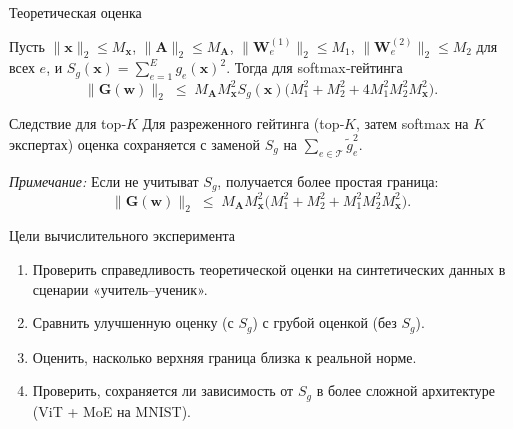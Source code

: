 \documentclass[aspectratio=169]{beamer}
\begin{document}
\begin{frame}{Теоретическая оценка}
    \begin{theorem}
        Пусть $\|\mathbf{x}\|_2 \le M_{\mathbf{x}}$, $\|\mathbf{A}\|_2 \le M_{\mathbf{A}}$,
        $\|\mathbf{W}_e^{(1)}\|_2 \le M_1$, $\|\mathbf{W}_e^{(2)}\|_2 \le M_2$ для всех $e$,
        и $S_g(\mathbf{x}) = \sum\limits_{e=1}^{E} g_e(\mathbf{x})^2$.
        Тогда для softmax‑гейтинга
        \[
            \|\mathbf{G}(\mathbf{w})\|_2 \;\le\;
            M_{\mathbf{A}} M_{\mathbf{x}}^2 S_g(\mathbf{x})
            \bigl( M_1^2 + M_2^2 + 4 M_1^2 M_2^2 M_{\mathbf{x}}^2 \bigr).
        \]
    \end{theorem}
    \begin{block}{Следствие для top‑$K$}
        Для разреженного гейтинга (top‑$K$, затем softmax на $K$ экспертах)
        оценка сохраняется с заменой $S_g$ на $\sum\limits_{e\in\mathcal{T}} \tilde g_e^2$.
    \end{block}
    \vspace{0.1cm}
    \textit{Примечание:} Если не учитыват $S_g$, получается более простая граница:
    \[
        \|\mathbf{G}(\mathbf{w})\|_2 \;\le\; M_{\mathbf{A}} M_{\mathbf{x}}^2 \bigl( M_1^2 + M_2^2 + M_1^2 M_2^2 M_{\mathbf{x}}^2 \bigr).
    \]
\end{frame}

\begin{frame}{Цели вычислительного эксперимента}
    \begin{enumerate}
        \item Проверить справедливость теоретической оценки на синтетических данных
              в сценарии «учитель–ученик».
        \item Сравнить улучшенную оценку (с $S_g$) с грубой оценкой (без $S_g$).
        \item Оценить, насколько верхняя граница близка к реальной норме.
        \item Проверить, сохраняется ли зависимость от $S_g$ в более сложной архитектуре
              (ViT + MoE на MNIST).
    \end{enumerate}
\end{frame}
\end{document}
